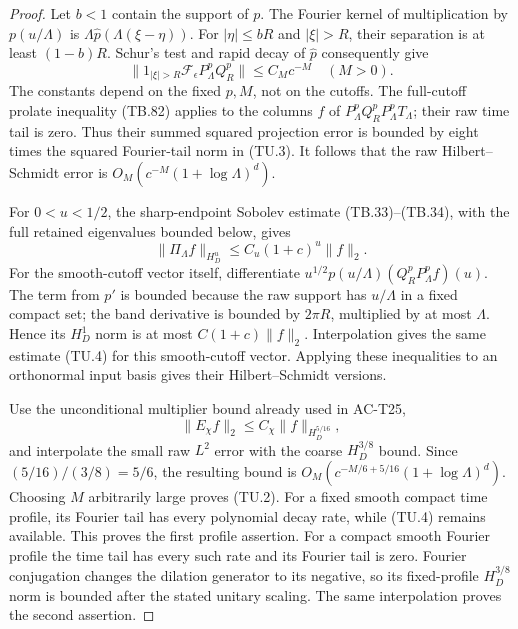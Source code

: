 \begin{proof}
Let \(b<1\) contain the support of \(p\).
The Fourier kernel of multiplication by \(p(u/\Lambda)\) is
\(\Lambda\widehat p(\Lambda(\xi-\eta))\).
For \(|\eta|\leq bR\) and \(|\xi|>R\), their separation
is at least \((1-b)R\).
Schur's test and rapid decay of \(\widehat p\) consequently give
\[
 \|1_{|\xi|>R}\mathcal F_\epsilon
                         P_\Lambda^pQ_R^p\|
                  \leq C_M c^{-M}\quad(M>0).
 \tag{TU.3}
\]
The constants depend on the fixed \(p,M\), not on the cutoffs.
The full-cutoff prolate inequality (TB.82) applies to the
columns \(f\) of \(P_\Lambda^pQ_R^pP_\Lambda^pT_\Lambda\);
their raw time tail is zero.
Thus their summed squared projection error is bounded by
eight times the squared Fourier-tail norm in (TU.3).
It follows that the raw Hilbert--Schmidt error is
\(O_M(c^{-M}(1+\log\Lambda)^d)\).

For \(0<u<1/2\), the sharp-endpoint Sobolev estimate
(TB.33)--(TB.34), with the full retained eigenvalues bounded
below, gives
\[
 \|\Pi_\Lambda f\|_{H_D^u}
                  \leq C_u(1+c)^u\|f\|_2.
 \tag{TU.4}
\]
For the smooth-cutoff vector itself, differentiate
\(u^{1/2}p(u/\Lambda)(Q_R^pP_\Lambda^p f)(u)\).
The term from \(p'\) is bounded because
the raw support has \(u/\Lambda\) in a fixed compact set;
the band derivative is bounded by \(2\pi R\), multiplied
by at most \(\Lambda\).
Hence its \(H_D^1\) norm is at most \(C(1+c)\|f\|_2\).
Interpolation gives the same estimate (TU.4) for this
smooth-cutoff vector.  Applying these inequalities to an
orthonormal input basis gives their Hilbert--Schmidt versions.

Use the unconditional multiplier bound already used in
AC-T25,
\[
 \|E_\chi f\|_2\leq C_\chi\|f\|_{H_D^{5/16}},
 \tag{TU.5}
\]
and interpolate the small raw \(L^2\) error with the coarse
\(H_D^{3/8}\) bound.  Since
\((5/16)/(3/8)=5/6\), the resulting bound is
\(O_M(c^{-M/6+5/16}(1+\log\Lambda)^d)\).
Choosing \(M\) arbitrarily large proves (TU.2).
For a fixed smooth compact time profile, its Fourier tail
has every polynomial decay rate, while (TU.4) remains
available.  This proves the first profile assertion.
For a compact smooth Fourier profile the time tail has
every such rate and its Fourier tail is zero.
Fourier conjugation changes the dilation generator to its
negative, so its fixed-profile \(H_D^{3/8}\) norm is bounded
after the stated unitary scaling.  The same interpolation
proves the second assertion.
\end{proof}

